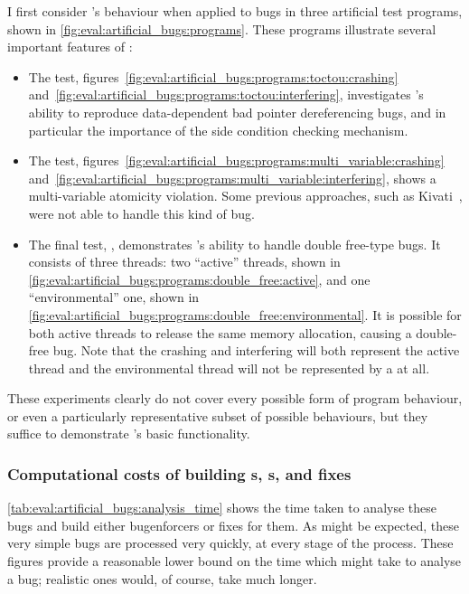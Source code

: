 \noindent
I first consider {\technique}'s behaviour when applied to bugs in
three artificial test programs, shown in
\autoref{fig:eval:artificial_bugs:programs}.  These programs
illustrate several important features of {\technique}:
\begin{itemize}
  \item The  test,
    figures~\ref{fig:eval:artificial_bugs:programs:toctou:crashing}
    and~\ref{fig:eval:artificial_bugs:programs:toctou:interfering},
    investigates {\technique}'s ability to reproduce data-dependent
    bad pointer dereferencing bugs, and in particular the importance
    of the side condition checking mechanism.
  \item The  test,
    figures~\ref{fig:eval:artificial_bugs:programs:multi_variable:crashing}
    and~\ref{fig:eval:artificial_bugs:programs:multi_variable:interfering},
    shows a multi-variable atomicity violation.  Some previous
    approaches, such as Kivati~\cite{Chew2010}, were not able to handle
    this kind of bug.
  \item The final test, , demonstrates
    {\technique}'s ability to handle double free-type bugs.  It
    consists of three threads: two ``active'' threads, shown in
    \autoref{fig:eval:artificial_bugs:programs:double_free:active},
    and one ``environmental'' one, shown in
    \autoref{fig:eval:artificial_bugs:programs:double_free:environmental}.
    It is possible for both active threads to release the same memory
    allocation, causing a double-free bug.  Note that the crashing and
    interfering {\StateMachines} will both represent the active thread
    and the environmental thread will not be represented by a
    {\StateMachine} at all.
\end{itemize}
These experiments clearly do not cover every possible form of program
behaviour, or even a particularly representative subset of possible
behaviours, but they suffice to demonstrate {\technique}'s basic
functionality.

\subsubsection{Computational costs of building s, s, and fixes}

\autoref{tab:eval:artificial_bugs:analysis_time} shows the time taken
to analyse these bugs and build either \glspl{bugenforcer} or fixes
for them.  As might be expected, these very simple bugs are processed
very quickly, at every stage of the process.  These figures provide a
reasonable lower bound on the time which {\technique} might take to
analyse a bug; realistic ones would, of course, take much longer.

